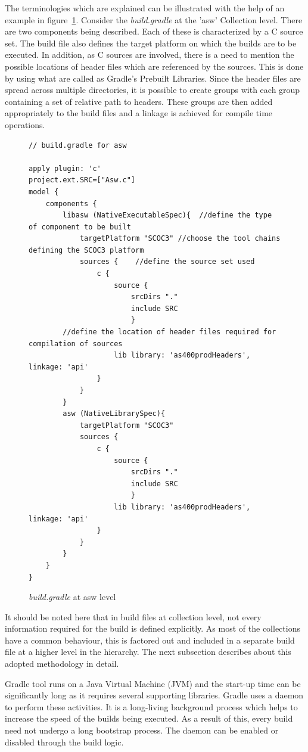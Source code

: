\documentclass[12pt, a4paper, titlepage]{scrartcl}
\newcommand{\courierword}[1]{\textsf{\itshape #1}}{\fontfamily{pcr}\selectfont}%
\begin{document}
\par The terminologies which are explained can be illustrated with the help of an example in figure~\ref{fig:terminology-explanation}. Consider the \emph{build.gradle} at the 'asw' Collection level. There are two components being described. Each of these is characterized by a C source set. The build file also defines the target platform on which the builds are to be executed. In addition, as C sources are involved, there is a need to mention the possible locations of header files which are referenced by the sources. This is done by using what are called as Gradle's Prebuilt Libraries. Since the header files are spread across multiple directories, it is possible to create groups with each group containing a set of relative path to headers. These groups are then added appropriately to the build files and a linkage is achieved for compile time operations. 

\begin{figure}[!ht]
\begin{lstlisting}[frame=single]
// build.gradle for asw

apply plugin: 'c'
project.ext.SRC=["Asw.c"]
model {
	components {
		libasw (NativeExecutableSpec){  //define the type of component to be built
			targetPlatform "SCOC3" //choose the tool chains defining the SCOC3 platform
			sources {    //define the source set used
				c {
					source {
						srcDirs "."
						include SRC
						}
		//define the location of header files required for compilation of sources
					lib library: 'as400prodHeaders', linkage: 'api' 
				}
			}
		}
		asw (NativeLibrarySpec){ 
			targetPlatform "SCOC3"
			sources {
				c {
					source {
						srcDirs "."
						include SRC
						}
					lib library: 'as400prodHeaders', linkage: 'api'
				}				
			}
		}	
	}
}
\end{lstlisting}
\caption{\courierword{build.gradle} at asw level}
\label{fig:terminology-explanation}
\end{figure}

\par It should be noted here that in build files at collection level, not every information required for the build is defined explicitly. As most of the collections have a common behaviour, this is factored out and included in a separate build file at a higher level in the hierarchy. The next subsection describes about this adopted methodology in detail. 
\par Gradle tool runs on a Java Virtual Machine (JVM) and the start-up time can be significantly long as it requires several supporting libraries. Gradle uses a daemon to perform these activities. It is a long-living background process which helps to increase the speed of the builds being executed. As a result of this, every build need not undergo a long bootstrap process. The daemon can be enabled or disabled through the build logic. 
\end{document}
